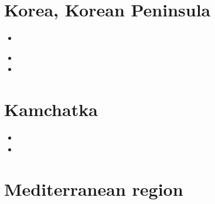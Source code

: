 
\section{Korea, Korean Peninsula} 

\begin{small}
\begin{itemize}
\item[2022]
\\
\item[2023]
\item[2026]
\end{itemize}
\end{small}

\section{Kamchatka}

\begin{small}
\begin{itemize}
\item[2007]
\item[2024]
\end{itemize}
\end{small}






\section{Mediterranean region}

